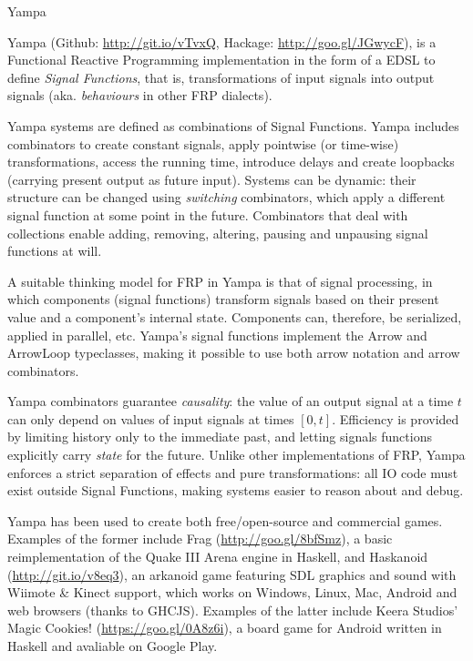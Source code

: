 \begin{hcarentry}[updated]{Yampa}
\label{yampa}
\makeheader

Yampa (Github: \href{http://git.io/vTvxQ}{http://git.io/vTvxQ}, Hackage:
\href{http://goo.gl/JGwycF}{http://goo.gl/JGwycF}), is a Functional Reactive
Programming implementation in the form of a EDSL to define \emph{Signal
Functions}, that is, transformations of input signals into output signals (aka.
\emph{behaviours} in other FRP dialects).

Yampa systems are defined as combinations of Signal Functions.  Yampa includes
combinators to create constant signals, apply  pointwise (or time-wise)
transformations, access the running time, introduce delays and create loopbacks
(carrying present output as future input). Systems can be dynamic: their
structure can be changed using \emph{switching} combinators, which apply a
different signal function at some point in the future. Combinators that deal
with collections enable adding, removing, altering, pausing and unpausing
signal functions at will.

A suitable thinking model for FRP in Yampa is that of signal processing, in
which components (signal functions) transform signals based on their present
value and a component's internal state. Components can, therefore, be
serialized, applied in parallel, etc. Yampa's signal functions implement the
Arrow and ArrowLoop typeclasses, making it possible to use both arrow
notation and arrow combinators.

Yampa combinators guarantee \emph{causality}: the value of an output signal at
a time $t$ can only depend on values of input signals at times $[0,t]$.
Efficiency is provided by limiting history only to the immediate past, and
letting signals functions explicitly carry \emph{state} for the future.  Unlike
other implementations of FRP, Yampa enforces a strict separation of effects and
pure transformations: all IO code must exist outside Signal Functions,
making systems easier to reason about and debug.

Yampa has been used to create both free/open-source and commercial games.
Examples of the former include Frag (\href{http://goo.gl/8bfSmz}{http://goo.gl/8bfSmz}), a basic
reimplementation of the Quake III Arena engine in Haskell, and Haskanoid
(\href{http://git.io/v8eq3}{http://git.io/v8eq3}), an arkanoid game featuring
SDL graphics and sound with Wiimote \& Kinect support, which works on Windows,
Linux, Mac, Android and web browsers (thanks to GHCJS). Examples of the latter
include Keera Studios' Magic Cookies!
(\href{https://goo.gl/0A8z6i}{https://goo.gl/0A8z6i}), a board game for Android
written in Haskell and avaliable on Google Play.


\end{hcarentry}
